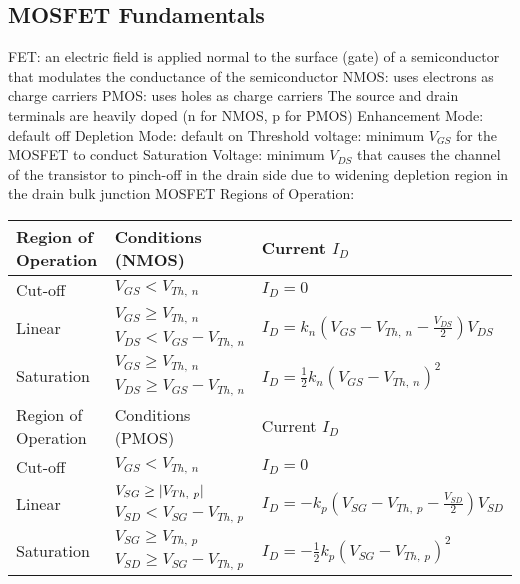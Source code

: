 \documentclass[a4paper,11pt]{article}
\begin{document}
	\subsection{MOSFET Fundamentals}
	\begin{outline}[enumerate]
		\1 FET: an electric field is applied normal to the surface (gate) of a semiconductor that modulates the conductance of the semiconductor
			\2 NMOS: uses electrons as charge carriers
			\2 PMOS: uses holes as charge carriers
		\1 The source and drain terminals are heavily doped (n for NMOS, p for PMOS)
			\2 Enhancement Mode: default off
			\2 Depletion Mode: default on
		\1 Threshold voltage: minimum $V_{GS}$ for the MOSFET to conduct 	
		\1 Saturation Voltage: minimum $V_{DS}$ that causes the channel of the transistor to pinch-off in the drain side due to widening depletion region in the drain bulk junction
		\1 MOSFET Regions of Operation:
		\begin{center}
			\begin{tabular}{|l|l|l|}
				\hline 
			Region of Operation & Conditions (NMOS) & Current $I_{D}$ \\ \hline 
			Cut-off & $V_{GS} < V_{Th,~n}$ & $I_{D} = 0$ \\ \hline 
			\multirow{2}{*}{Linear} & $V_{GS} \geq V_{Th,~n}$ & \multirow{2}{*}{$I_{D} = k_{n} \left( V_{GS} - V_{Th,~n} - \frac{V_{DS}}{2} \right) V_{DS}$} \\ 
			& $V_{DS} < V_{GS} - V_{Th,~n}$ & \\ \hline
			\multirow{2}{*}{Saturation} & $V_{GS} \geq V_{Th,~n}$ & \multirow{2}{*}{$I_{D} = \frac{1}{2}k_{n} \left( V_{GS} - V_{Th,~n} \right)^{2}$} \\ 
			& $V_{DS} \geq V_{GS} - V_{Th,~n}$ & \\ \hline
			Region of Operation & Conditions (PMOS) & Current $I_{D}$ \\ \hline 
			Cut-off & $V_{GS} < V_{Th,~n}$ & $I_{D} = 0$ \\ \hline 
			\multirow{2}{*}{Linear} & $V_{SG} \geq \left \lvert V_{Th,~p} \right \rvert$ & \multirow{2}{*}{$I_{D} = -k_{p} \left( V_{SG} - V_{Th,~p} - \frac{V_{SD}}{2} \right) V_{SD}$} \\ 
			& $V_{SD} < V_{SG} - V_{Th,~p}$ & \\ \hline
			\multirow{2}{*}{Saturation} & $V_{SG} \geq V_{Th,~p}$ & \multirow{2}{*}{$I_{D} = -\frac{1}{2}k_{p} \left( V_{SG} - V_{Th,~p} \right)^{2}$} \\ 
			& $V_{SD} \geq V_{SG} - V_{Th,~p}$ & \\ \hline
			\end{tabular}
		\end{center}
	\end{outline}
\end{document}

